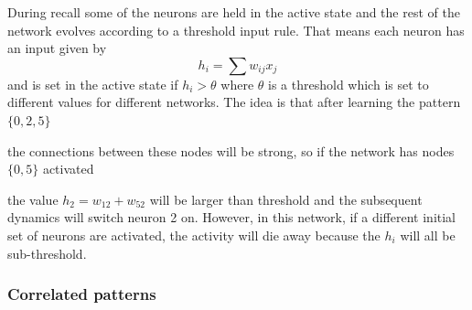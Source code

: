 \documentclass[12pt]{article}
\begin{document}
During recall some of the neurons are held in the active state and the
rest of the network evolves according to a threshold input rule. That
means each neuron has an input given by
\begin{equation}
h_i=\sum{w_{ij}x_j}
\end{equation}
and is set in the active state if $h_i>\theta$ where $\theta$ is a
threshold which is set to different values for different networks. The idea is that after learning the pattern $\{0,2,5\}$ 
\begin{center}
\end{center}
the connections between these nodes will be strong, so if the network has nodes $\{0,5\}$ activated
\begin{center}
\end{center}
the value $h_{2}=w_{12}+w_{52}$ will be larger than threshold and the
subsequent dynamics will switch neuron 2 on. However, in this network,
if a different initial set of neurons are activated, the activity will
die away because the $h_i$ will all be sub-threshold.

\subsubsection*{Correlated patterns}
\end{document}
